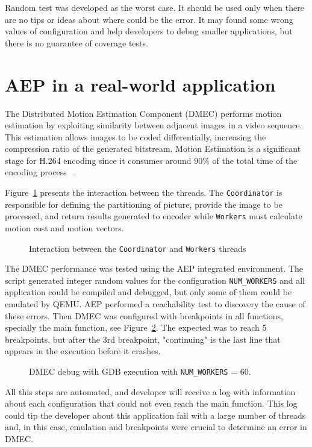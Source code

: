 \documentclass[conference]{IEEEtran}
\newcommand{\fig}[4][thb]{
  \begin{figure}[#1] {\centering{\texttt{[image: fig/\#2]}}\par}
    \captionsetup{font=small}
    \caption{#3\label{fig:#2}}
  \end{figure}
}
\begin{document}
Random test was developed as the worst case. It should be used only when there  are no tips or ideas about where could be the error. It may  found some wrong values of configuration and help developers to debug smaller applications, but there is no guarantee of coverage tests.

\section{AEP in a real-world application}
\label{sec:DMEC_Conf}
The Distributed Motion Estimation Component (DMEC) performs motion estimation by exploiting similarity between adjacent images in a video sequence. This estimation allows images to be coded differentially, increasing the compression ratio of the generated bitstream. Motion Estimation is a significant stage for H.264 encoding since it consumes around 90\% of the total time of the encoding process ~\cite{dmec}.

Figure~\ref{fig:dmec} presents the interaction between the threads. The \texttt{Coordinator} is responsible for defining the partitioning of picture, provide the image to be processed, and return results generated to encoder while \texttt{Workers} must calculate motion cost and motion vectors.

\fig{dmec}{Interaction between the \texttt{Coordinator} and \texttt{Workers} threads ~\cite{dmec}}{scale=.4}

The DMEC performance was tested using the AEP integrated environment. The script generated integer random values for the configuration \texttt{NUM\_WORKERS} and all application could be compiled and debugged, but only some of them could be emulated by QEMU. AEP performed a reachability test to discovery the cause of these errors. Then DMEC was configured with breakpoints in all functions, specially the main function, see Figure~\ref{fig:gdb_dmec_60_workers}. The expected was to reach 5 breakpoints, but after the 3rd breakpoint, "continuing" is the last line that appears in the execution before it crashes.

\fig{gdb_dmec_60_workers}{DMEC debug with GDB execution with \texttt{NUM\_WORKERS} = 60.}{scale=.43}

All this steps are automated, and developer will receive a log with information about each configuration that could not even reach the main function. This log could tip the developer about this application fail with a large number of threads and, in this case, emulation and breakpoints were crucial to determine an error in DMEC.
\end{document}
